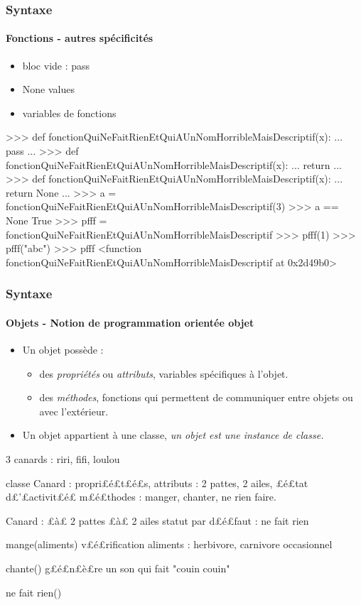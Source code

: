 \begin{frame}[fragile]
\frametitle{Syntaxe}
\framesubtitle{Fonctions - autres spécificités}
\begin{itemize}
\item bloc vide : pass 
\item None values
\item variables de fonctions 
\end{itemize}
\begin{pythonConsole}
>>> def fonctionQuiNeFaitRienEtQuiAUnNomHorribleMaisDescriptif(x): 
...    pass
...
>>> def fonctionQuiNeFaitRienEtQuiAUnNomHorribleMaisDescriptif(x): 
...    return
...
>>> def fonctionQuiNeFaitRienEtQuiAUnNomHorribleMaisDescriptif(x): 
...    return None
...
>>> a = fonctionQuiNeFaitRienEtQuiAUnNomHorribleMaisDescriptif(3)
>>> a == None
True
>>> pfff = fonctionQuiNeFaitRienEtQuiAUnNomHorribleMaisDescriptif
>>> pfff(1)
>>> pfff("abc")
>>> pfff
<function fonctionQuiNeFaitRienEtQuiAUnNomHorribleMaisDescriptif at 0x2d49b0>
\end{pythonConsole}
\end{frame}
\begin{frame}[fragile]
\frametitle{Syntaxe}
\framesubtitle{Objets - Notion de programmation orientée objet}
\begin{itemize}
\item Un objet possède : 
 \begin{itemize}
 \footnotesize
  \item des {\em propriétés} ou {\em attributs}, variables spécifiques à l'objet. 
  \item des {\em méthodes}, fonctions qui permettent de communiquer entre objets ou avec l'extérieur. 
 \end{itemize}
\item Un objet appartient à une classe, {\em un objet est une instance de classe. }
\end{itemize}

\begin{pythonConsole}
3 canards : riri, fifi, loulou

classe Canard : 
propri£é£t£é£s, attributs : 2 pattes, 2 ailes, £é£tat d£'£activit£é£
m£é£thodes : manger, chanter, ne rien faire.  

Canard : 
 £à£ 2 pattes
 £à£ 2 ailes
 statut par d£é£faut : ne fait rien
 
 mange(aliments)
  v£é£rification aliments : herbivore, carnivore occasionnel 
 
 chante()
  g£é£n£è£re un son qui fait "couin couin"  

 ne fait rien()
  
\end{pythonConsole}
\end{frame}
